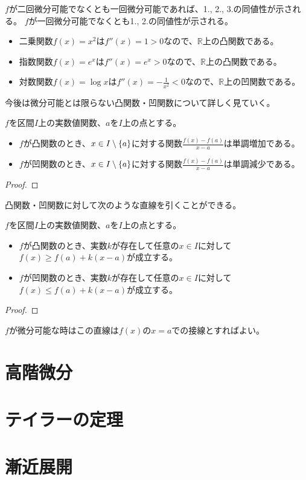 \begin{remark}
$f$が二回微分可能でなくとも一回微分可能であれば、1., 2., 3.の同値性が示される。
$f$が一回微分可能でなくとも1., 2.の同値性が示される。
\end{remark}

\begin{example}
\begin{itemize}
\item
二乗関数$f(x) = x^2$は$f''(x) = 1 > 0$なので、$\mathbb{R}$上の凸関数である。
\item
指数関数$f(x) = e^x$は$f''(x) = e^x > 0$なので、$\mathbb{R}$上の凸関数である。
\item
対数関数$f(x) = \log x$は$f''(x) = -\frac{1}{x^2} < 0$なので、$\mathbb{R}$上の凹関数である。
\end{itemize}
\end{example}

今後は微分可能とは限らない凸関数・凹関数について詳しく見ていく。

\begin{proposition}
$f$を区間$I$上の実数値関数、$a$を$I$上の点とする。
\begin{itemize}
\item
$f$が凸関数のとき、$x \in I\setminus\{a\}$に対する関数$\frac{f(x)-f(a)}{x-a}$は単調増加である。
\item
$f$が凹関数のとき、$x \in I\setminus\{a\}$に対する関数$\frac{f(x)-f(a)}{x-a}$は単調減少である。
\end{itemize}
\end{proposition}

\begin{proof}

\end{proof}

凸関数・凹関数に対して次のような直線を引くことができる。

\begin{proposition}
$f$を区間$I$上の実数値関数、$a$を$I$上の点とする。
\begin{itemize}
\item
$f$が凸関数のとき、実数$k$が存在して任意の$x \in I$に対して$f(x) \ge f(a)+k(x-a)$が成立する。
\item
$f$が凹関数のとき、実数$k$が存在して任意の$x \in I$に対して$f(x) \le f(a)+k(x-a)$が成立する。
\end{itemize}
\end{proposition}

\begin{proof}

\end{proof}

\begin{remark}
$f$が微分可能な時はこの直線は$f(x)$の$x = a$での接線とすればよい。
\end{remark}

\section{高階微分}

\section{テイラーの定理}

\section{漸近展開}
